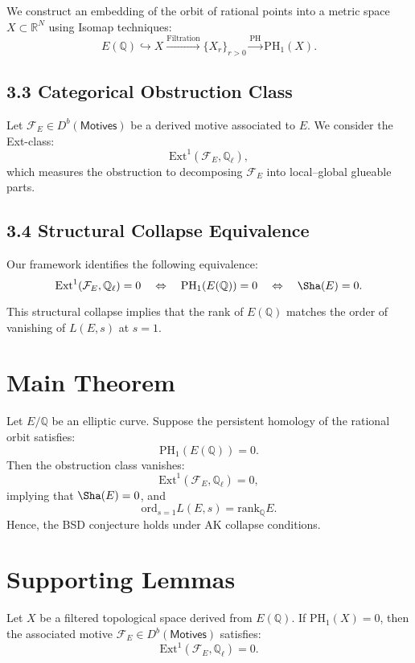 We construct an embedding of the orbit of rational points into a metric space \( X \subset \mathbb{R}^N \) using Isomap techniques:
\[
E(\mathbb{Q}) \hookrightarrow X \xrightarrow{\mathrm{Filtration}} \{ X_r \}_{r > 0} \xrightarrow{\mathrm{PH}} \mathrm{PH}_1(X).
\]

\subsection{3.3 Categorical Obstruction Class}

Let \( \mathcal{F}_E \in D^b(\mathsf{Motives}) \) be a derived motive associated to \( E \).  
We consider the Ext-class:
\[
\mathrm{Ext}^1(\mathcal{F}_E, \mathbb{Q}_\ell),
\]
which measures the obstruction to decomposing \( \mathcal{F}_E \) into local–global glueable parts.

\subsection{3.4 Structural Collapse Equivalence}

Our framework identifies the following equivalence:
\[
\mathrm{Ext}^1(\mathcal{F}_E, \mathbb{Q}_\ell) = 0 \quad \Leftrightarrow \quad \mathrm{PH}_1(E(\mathbb{Q})) = 0 \quad \Leftrightarrow \quad \Sha(E) = 0.
\]

This structural collapse implies that the rank of \( E(\mathbb{Q}) \) matches the order of vanishing of \( L(E,s) \) at \( s=1 \).

\section{Main Theorem}

\begin{theorem}
Let \( E/\mathbb{Q} \) be an elliptic curve.  
Suppose the persistent homology of the rational orbit satisfies:
\[
\mathrm{PH}_1(E(\mathbb{Q})) = 0.
\]
Then the obstruction class vanishes:
\[
\mathrm{Ext}^1(\mathcal{F}_E, \mathbb{Q}_\ell) = 0,
\]
implying that \( \Sha(E) = 0 \), and
\[
\mathrm{ord}_{s=1}L(E,s) = \mathrm{rank}_\mathbb{Q}E.
\]
Hence, the BSD conjecture holds under AK collapse conditions.
\end{theorem}

\section{Supporting Lemmas}

\begin{lemma}
Let \( X \) be a filtered topological space derived from \( E(\mathbb{Q}) \).  
If \( \mathrm{PH}_1(X) = 0 \), then the associated motive \( \mathcal{F}_E \in D^b(\mathsf{Motives}) \) satisfies:
\[
\mathrm{Ext}^1(\mathcal{F}_E, \mathbb{Q}_\ell) = 0.
\]
\end{lemma}


